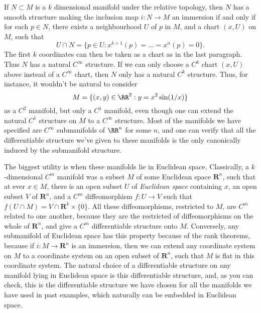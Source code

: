 \begin{remark}
    If $N \subset M$ is a $k$ dimensional manifold under the relative topology, then $N$ has a smooth structure making the inclusion map $i: N \to M$ an immersion if and only if for each $p \in N$, there exists a neighbourhood $U$ of $p$ in $M$, and a chart $(x,U)$ on $M$, such that
    \[ U \cap N = \{ p \in U : x^{k+1}(p) = \dots = x^n(p) = 0 \}. \]
    The first $k$ coordinates can then be taken as a chart as in the last paragraph. Thus $N$ has a natural $C^\infty$ structure. If we can only choose a $C^k$ chart $(x,U)$ above instead of a $C^\infty$ chart, then $N$ only has a natural $C^k$ structure. Thus, for instance, it wouldn't be natural to consider
    \[ M = \{ (x,y) \in \RR^2: y = x^2 \sin(1/x) \} \]
    as a $C^2$ manifold, but only a $C^1$ manifold, even though one can extend the natural $C^1$ structure on $M$ to a $C^\infty$ structure. Most of the manifolds we have specified are $C^\infty$ submanifolds of $\RR^n$ for some $n$, and one can verify that all the differentiable structure we've given to these manifolds is the only canonically induced by the submanifold structure.
\end{remark}

\begin{example}
    The biggest utility is when these manifolds lie in Euclidean space. Classically, a $k$-dimensional $C^m$ manifold was a subset $M$ of some Euclidean space $\mathbf{R}^n$, such that at ever $x \in M$, there is an open subset $U$ of {\it Euclidean space} containing $x$, an open subset $V$ of $\mathbf{R}^n$, and a $C^m$ diffeomorphism $f: U \to V$ such that $f(U \cap M) = V \cap \mathbf{R}^k \times \{ 0 \}$. All these diffeomorphisms, restricted to $M$, are $C^m$ related to one another, because they are the restricted of diffeomorphisms on the whole of $\mathbf{R}^n$, and give a $C^m$ differentiable structure onto $M$. Conversely, any submanifold of Euclidean space has this property because of the rank theorems, because if $i: M \to \mathbf{R}^n$ is an immersion, then we can extend any coordinate system on $M$ to a coordinate system on an open subset of $\mathbf{R}^n$, such that $M$ is flat in this coordinate system. The natural choice of a differentiable structure on any manifold lying in Euclidean space is this differentiable structure, and, as you can check, this is the differentiable structure we have chosen for all the manifolds we have used in past examples, which naturally can be embedded in Euclidean space.
\end{example}

